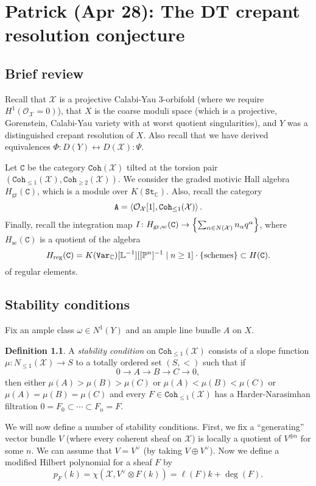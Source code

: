 \documentclass[leqno, openany]{memoir}
\theoremstyle{definition}
\newtheorem{defn}[thm]{Definition}
\theoremstyle{remark}
\theoremstyle{plain}
\theoremstyle{definition}
\theoremstyle{remark}
\newcommand{\C}{\mathbb{C}}
\renewcommand{\L}{\mathbb{L}}
\renewcommand{\P}{\mathbb{P}}
\newcommand{\mc}[1]{\mathcal{#1}}
\newcommand{\mr}[1]{\mathrm{#1}}
\newcommand{\mt}[1]{\mathtt{#1}}
\begin{document}
\chapter{Patrick (Apr 28): The DT crepant resolution conjecture}%

\section{Brief review}

Recall that $\mc{X}$ is a projective Calabi-Yau 3-orbifold (where we require $H^1(\mc{O}_{\mc{X}} = 0)$), that $X$ is the coarse moduli space (which is a projective, Gorenstein, Calabi-Yau variety with at worst quotient singularities), and $Y$ was a distinguished crepant resolution of $X$. Also recall that we have derived equivalences $\Phi \colon D(Y) \leftrightarrow D(\mc{X}) \colon \Psi$.

Let $\mt{C}$ be the category $\mt{Coh}(\mc{X})$ tilted at the torsion pair $(\mt{Coh}_{\leq 1}(\mc{X}), \mt{Coh}_{\geq 2}(\mc{X}))$. We consider the graded motivic Hall algebra $H_{\mr{gr}}(\mt{C})$, which is a module over $K(\mt{St}_{\C})$. Also, recall the category
\[ \mt{A} = \ev{\mc{O}_{\mc{X}}[1], \mt{Coh}_{\leq 1}(\mc{X})}. \]
Finally, recall the integration map $I \colon H_{\mr{gr,sc}}(\mt{C}) \to \qty{\sum_{\alpha \in N(\mc{X})} n_{\alpha} q^{\alpha}}$, where $H_{\mr{sc}}(\mt{C})$ is a quotient of the algebra 
\[ H_{\mr{reg}}(\mt{C}) = K(\mt{Var}_{\C})[\L^{-1}][[\P^n]^{-1} \mid n \geq 1] \cdot \qty{\text{schemes}} \subset H(\mt{C}). \]
of regular elements.

\section{Stability conditions}

Fix an ample class $\omega \in N^1(Y)$ and an ample line bundle $A$ on $X$.

\begin{defn}
    A \textit{stability condition} on $\mt{Coh}_{\leq 1}(\mc{X})$ consists of a slope function $\mu \colon N_{\leq 1}(\mc{X}) \to S$ to a totally ordered set $(S, <)$ such that if
    \[ 0 \to A \to B \to C \to 0, \]
    then either $\mu(A) > \mu(B) > \mu(C)$ or $\mu(A) < \mu(B) < \mu(C)$ or $\mu(A) = \mu(B) = \mu(C)$ and every $F \in \mt{Coh}_{\leq 1}(\mc{X})$ has a Harder-Narasimhan filtration $0 = F_0 \subset \cdots \subset F_n = F$.
\end{defn}

We will now define a number of stability conditions. First, we fix a ``generating'' vector bundle $V$ (where every coherent sheaf on $\mc{X}$) is locally a quotient of $V^{\oplus n}$ for some $n$. We can assume that $V = V^{\vee}$ (by taking $V \oplus V^{\vee}$). Now we define a modified Hilbert polynomial for a sheaf $F$ by
\[ p_F(k) = \chi(\mc{X}, V^{\vee} \otimes F(k)) = \ell(F) k + \deg(F). \]
\end{document}
